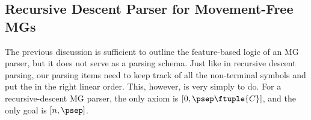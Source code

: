 \subsection{Recursive Descent Parser for Movement-Free MGs}
\label{sub:MG-TopDown_Movement-Free}
The previous discussion is sufficient to outline the feature-based logic of an MG parser, but it does not serve as a parsing schema.
Just like in recursive descent parsing, our parsing items need to keep track of all the non-terminal symbols and put the in the right linear order.
This, however, is very simply to do.
%
For a recursive-descent MG parser, the only axiom is $[0,\psep \ftuple{C}]$, and the only goal is $[n,\psep]$.
%
\begin{prooftree}
\end{prooftree}
%
\begin{prooftree}
\end{prooftree}
%
\begin{prooftree}
\end{prooftree}
%
\begin{prooftree}
\end{prooftree}

